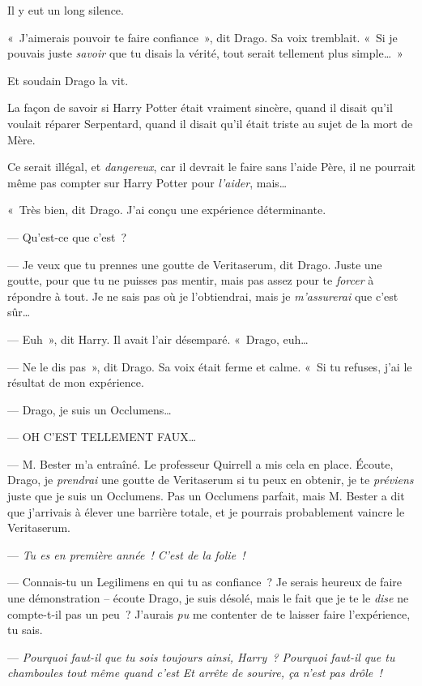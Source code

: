 Il y eut un long silence.

«~J'aimerais pouvoir te faire confiance~», dit Drago. Sa voix tremblait. «~Si je pouvais juste \emph{savoir} que tu disais la vérité, tout serait tellement plus simple…~»

Et soudain Drago la vit.

La façon de savoir si Harry Potter était vraiment sincère, quand il disait qu'il voulait réparer Serpentard, quand il disait qu'il était triste au sujet de la mort de Mère.

Ce serait illégal, et \emph{dangereux}, car il devrait le faire sans l'aide Père, il ne pourrait même pas compter sur Harry Potter pour \emph{l'aider}, mais…

«~Très bien, dit Drago. J'ai conçu une expérience déterminante.

--- Qu'est-ce que c'est~?

--- Je veux que tu prennes une goutte de Veritaserum, dit Drago. Juste une goutte, pour que tu ne puisses pas mentir, mais pas assez pour te \emph{forcer} à répondre à tout. Je ne sais pas où je l'obtiendrai, mais je \emph{m'assurerai} que c'est sûr…

--- Euh~», dit Harry. Il avait l'air désemparé. «~Drago, euh…

--- Ne le dis pas~», dit Drago. Sa voix était ferme et calme. «~Si tu refuses, j'ai le résultat de mon expérience.

--- Drago, je suis un Occlumens…

--- OH C'EST TELLEMENT FAUX…

--- M. Bester m'a entraîné. Le professeur Quirrell a mis cela en place. Écoute, Drago, je \emph{prendrai} une goutte de Veritaserum si tu peux en obtenir, je te \emph{préviens} juste que je suis un Occlumens. Pas un Occlumens parfait, mais M. Bester a dit que j'arrivais à élever une barrière totale, et je pourrais probablement vaincre le Veritaserum.

--- \emph{Tu es en première année~! C'est de la folie~!}

--- Connais-tu un Legilimens en qui tu as confiance~? Je serais heureux de faire une démonstration -- écoute Drago, je suis désolé, mais le fait que je te le \emph{dise} ne compte-t-il pas un peu~? J'aurais \emph{pu} me contenter de te laisser faire l'expérience, tu sais.

--- \emph{ Pourquoi faut-il que tu sois toujours ainsi, Harry~? Pourquoi faut-il que tu chamboules tout même quand c'est  Et arrête de sourire, ça n'est pas drôle~!}

